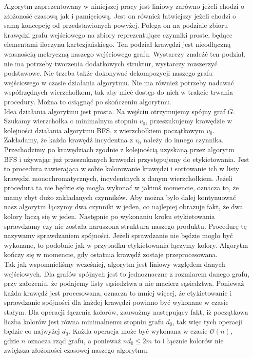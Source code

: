 \documentclass[12pt,a4paper,titlepage]{article}
\begin{document}
Algorytm zaprezentowany w niniejszej pracy jest liniowy zarówno jeżeli chodzi o złożoność czasową jak i pamięciową. Jest on również łatwiejszy jeżeli chodzi o samą koncepcję od przedstawionych powyżej. Polega on na podziale zbioru krawędzi grafu wejściowego na zbiory reprezentujące czynniki proste, będące elementami iloczynu kartezjańskiego. Ten podział krawędzi jest nieodłączną własnością metryczną naszego wejściowego grafu. Wystarczy znaleźć ten podział, nie ma potrzeby tworzenia dodatkowych struktur, wystarczy rozszerzyć podstawowe. Nie trzeba także dokonywać dekompozycji naszego grafu wejściowego w czasie działania algorytmu. Nie ma również potrzeby nadawać współrzędnych wierzchołkom, tak aby mieć dostęp do nich w trakcie trwania procedury. Można to osiągnąć po skończeniu algorytmu. \\
Idea działania algorytmu jest prosta. Na wejściu otrzymujemy spójny graf $G$. Szukamy wierzchołka o minimalnym stopniu $v_0$, przeszukujemy krawędzie w kolejności działania algorytmu BFS, z wierzchołkiem początkowym $v_0$. Zakładamy, że każda krawędź incydentna z $v_0$ należy do innego czynnika. Przechodzimy po krawędziach zgodnie z kolejnością uzyskaną przez algorytm BFS i używając już przeszukanych krawędzi przystępujemy do etykietowania. Jest to procedura zawierająca w sobie kolorowanie krawędzi i sortowanie ich w listy krawędzi monochromatycznych, incydentnych z danym wierzchołkiem. Jeżeli procedura ta nie będzie się mogła wykonać w jakimś momencie, oznacza to, że mamy zbyt dużo zakładanych czynników. Aby można było dalej kontynuować nasz algorytm łączymy dwa czynniki w jeden, co najlepiej obrazuje fakt, że dwa kolory łączą się w jeden. Następnie po wykonaniu kroku etykietowania sprawdzamy czy nie została naruszona struktura naszego produktu. Procedurę tę nazywamy sprawdzaniem spójności. Jeżeli sprawdzanie nie będzie mogło być wykonane, to podobnie jak w przypadku etykietowania łączymy kolory. Algorytm kończy się w momencie, gdy ostatnia krawędź zostaje przeprocesowana. \\
Tak jak wspomnieliśmy wcześniej, algorytm jest liniowy względem danych wejściowych. Dla grafów spójnych jest to jednoznaczne z rozmiarem danego grafu, przy założeniu, że podajemy listy sąsiedztwa a nie macierz sąsiedztwa. Ponieważ każda krawędź jest procesowana, oznacza to mniej więcej, że etykietowanie i sprawdzanie spójności dla każdej krawędzi powinno być wykonane w czasie stałym. Dla operacji łączenia kolorów, zauważmy następujący fakt, iż początkowa liczba kolorów jest równa minimalnemu stopniu grafu $d_0$, tak więc tych operacji będzie co najwyżej $d_0$. Każda operacja może być wykonana w czasie $\mathcal{O}(n)$, gdzie $n$ oznacza rząd grafu, a ponieważ $nd_0 \leq 2m $ to i łącznie kolorów nie zwiększa złożoności czasowej naszego algorytmu.\\
\end{document}
